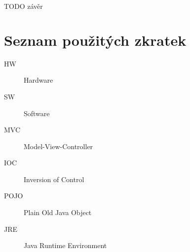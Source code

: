 \documentclass[thesis=B,czech]{FITthesis}[2012/06/26]
\begin{document}
\begin{conclusion}
	TODO závěr
\end{conclusion}




\appendix

\chapter{Seznam použitých zkratek}
\begin{description}
	\item[HW] Hardware
	\item[SW] Software
	\item[MVC] Model-View-Controller
	\item[IOC] Inversion of Control
	\item[POJO] Plain Old Java Object
	\item[JRE] Java Runtime Environment
\end{description}
\end{document}
